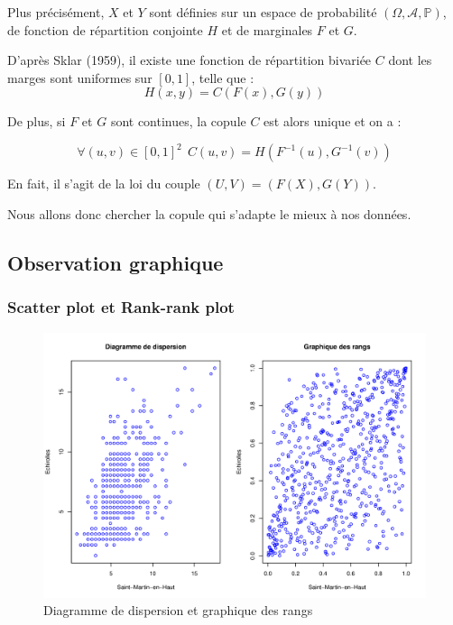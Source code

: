 Plus précisément, $X$ et $Y$  sont définies sur un espace de probabilité $(\Omega,\mathcal{A},\mathbb{P})$, de fonction de répartition conjointe $H$ et de marginales $F$ et $G$.

D'après Sklar (1959), il existe une fonction de répartition bivariée $C$ dont les marges sont uniformes sur $[0,1]$, telle que :
$$
H(x,y) = C(F(x),G(y))
$$

De plus, si $F$ et $G$ sont continues, la copule $C$ est alors unique et on a :

$$
\forall (u,v) \in [0,1]^2 ~~ C(u,v) = H(F^{-1}(u),G^{-1}(v))
$$

En fait, il s'agit de la loi du couple $(U,V) = (F(X),G(Y))$.

Nous allons donc chercher la copule qui s’adapte le mieux à nos données.




\subsection{Observation graphique}



\subsubsection{Scatter plot et Rank-rank plot}

\noindent%
\begin{figure}[H]
    \begin{center}
      \includegraphics[width=17 cm, angle=0]{./pictures/scatter_et_rankrank.png}
      \centering\caption{Diagramme de dispersion et graphique des rangs}
    \end{center}
\end{figure}




